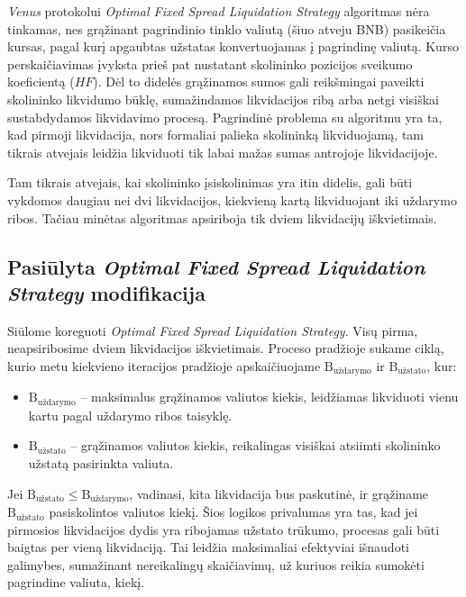 \documentclass[]{VUMIFTemplateClass}
\begin{document}
\textit{Venus} protokolui \textit{Optimal Fixed Spread Liquidation Strategy} algoritmas nėra tinkamas, nes grąžinant pagrindinio tinklo valiutą (šiuo atveju BNB) pasikeičia kursas, pagal kurį apgaubtas užstatas konvertuojamas į pagrindinę valiutą. Kurso perskaičiavimas įvyksta prieš pat nustatant skolininko pozicijos sveikumo koeficientą ($HF$). Dėl to didelės grąžinamos sumos gali reikšmingai paveikti skolininko likvidumo būklę, sumažindamos likvidacijos ribą arba netgi visiškai sustabdydamos likvidavimo procesą. Pagrindinė problema su algoritmu yra ta, kad pirmoji likvidacija, nors formaliai palieka skolininką likviduojamą, tam tikrais atvejais leidžia likviduoti tik labai mažas sumas antrojoje likvidacijoje.

Tam tikrais atvejais, kai skolininko įsiskolinimas yra itin didelis, gali būti vykdomos daugiau nei dvi likvidacijos, kiekvieną kartą likviduojant iki uždarymo ribos. Tačiau minėtas algoritmas apsiriboja tik dviem likvidacijų iškvietimais.

\subsection{Pasiūlyta \textit{Optimal Fixed Spread Liquidation Strategy} modifikacija}

Siūlome koreguoti \textit{Optimal Fixed Spread Liquidation Strategy}. Visų pirma, neapsiribosime dviem likvidacijos iškvietimais. Proceso pradžioje sukame ciklą, kurio metu kiekvieno iteracijos pradžioje apskaičiuojame $\text{B}_{\text{uždarymo}}$ ir $\text{B}_{\text{užstato}}$, kur:

\begin{itemize}
\item $\text{B}_{\text{uždarymo}}$ – maksimalus grąžinamos valiutos kiekis, leidžiamas likviduoti vienu kartu pagal uždarymo ribos taisyklę.
\item $\text{B}_{\text{užstato}}$ – grąžinamos valiutos kiekis, reikalingas visiškai atsiimti skolininko užstatą pasirinkta valiuta.
\end{itemize}

Jei $\text{B}_{\text{užstato}} \leq \text{B}_{\text{uždarymo}}$, vadinasi, kita likvidacija bus paskutinė, ir grąžiname $\text{B}_{\text{užstato}}$ pasiskolintos valiutos kiekį. Šios logikos privalumas yra tas, kad jei pirmosios likvidacijos dydis yra ribojamas užstato trūkumo, procesas gali būti baigtas per vieną likvidaciją. Tai leidžia maksimaliai efektyviai išnaudoti galimybes, sumažinant nereikalingų skaičiavimų, už kuriuos reikia sumokėti pagrindine valiuta, kiekį.
\end{document}
